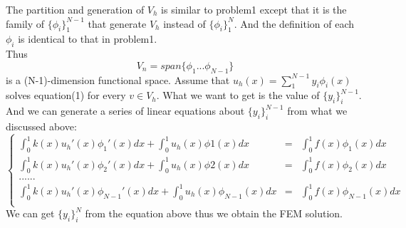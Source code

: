 \documentclass[a4paper,12pt]{article}
\begin{document}
The partition and generation of $V_h$ is similar to problem1 except that it is the family of $\{\phi_i\}_1^{N-1}$ that generate $V_h$ instead of $\{\phi_i\}_1^{N}$. And the definition of each $\phi_i$ is identical to that in problem1.
\\Thus $$V_n = span\{\phi_1...\phi_{N-1}\}$$ is a (N-1)-dimension functional space.
\newline Assume that $u_h(x)=\sum_1^{N-1}y_i\phi_i(x)$ solves equation(1) for every $v \in V_h$. What we want to get is the value of $\{y_i\}_i^{N-1}$. And we can generate a series of linear equations about $\{y_i\}_i^{N-1}$ from what we discussed above:\\
$$
\left\{
\begin{array}{rcl}
\int_0^1k(x)u_h'(x)\phi_1'(x)dx + \int_0^1u_h(x)\phi1(x)dx &=& \int_0^1f(x)\phi_1(x)dx\\
\int_0^1k(x)u_h'(x)\phi_2'(x)dx + \int_0^1u_h(x)\phi2(x)dx &=& \int_0^1f(x)\phi_2(x)dx\\
......& & \\
\int_0^1k(x)u_h'(x)\phi_{N-1}'(x)dx +\int_0^1u_h(x)\phi_{N-1}(x)dx &=& \int_0^1f(x)\phi_{N-1}(x)dx\\

\end{array} \right.
$$
We can get $\{y_i\}_i^N$ from the equation above thus we obtain the FEM solution.
\end{document}

